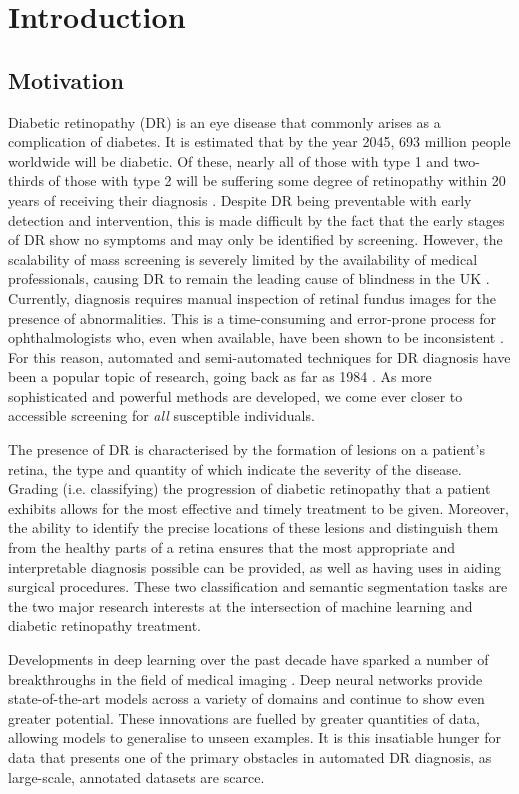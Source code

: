 \chapter{Introduction}
\section{Motivation}

Diabetic retinopathy (DR) is an eye disease that commonly arises as a complication of diabetes.
It is estimated that by the year 2045, 693 million people worldwide will be diabetic.
Of these, nearly all of those with type 1 and two-thirds of those with type 2 will be suffering some degree of retinopathy within 20 years of receiving their diagnosis \cite{Mathure014444}.
Despite DR being preventable with early detection and intervention, this is made difficult by the fact that the early stages of DR show no symptoms and may only be identified by screening.
However, the scalability of mass screening is severely limited by the availability of medical professionals, causing DR to remain the leading cause of blindness in the UK \cite{Liewe004015}.
Currently, diagnosis requires manual inspection of retinal fundus images for the presence of abnormalities.
This is a time-consuming and error-prone process for ophthalmologists who, even when available, have been shown to be inconsistent \cite{DBLP:journals/corr/abs-1710-01711}.
For this reason, automated and semi-automated techniques for DR diagnosis have been a popular topic of research, going back as far as 1984 \cite{olddr}.
As more sophisticated and powerful methods are developed, we come ever closer to accessible screening for \emph{all} susceptible individuals.

The presence of DR is characterised by the formation of lesions on a patient's retina, the type and quantity of which indicate the severity of the disease.
Grading (i.e. classifying) the progression of diabetic retinopathy that a patient exhibits allows for the most effective and timely treatment to be given. 
Moreover, the ability to identify the precise locations of these lesions and distinguish them from the healthy parts of a retina ensures that the most appropriate and interpretable diagnosis possible can be provided, as well as having uses in aiding surgical procedures. 
These two classification and semantic segmentation tasks are the two major research interests at the intersection of machine learning and diabetic retinopathy treatment.

Developments in deep learning over the past decade have sparked a number of breakthroughs in the field of medical imaging \cite{LUNDERVOLD2019}.
Deep neural networks provide state-of-the-art models across a variety of domains and continue to show even greater potential.
These innovations are fuelled by greater quantities of data, allowing models to generalise to unseen examples.
It is this insatiable hunger for data that presents one of the primary obstacles in automated DR diagnosis, as large-scale, annotated datasets are scarce.

